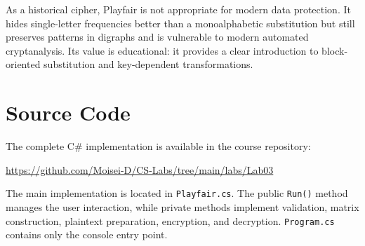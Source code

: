 \documentclass[12pt,a4paper]{article}
\begin{document}
As a historical cipher, Playfair is not appropriate for modern data protection. It hides single-letter frequencies better than a monoalphabetic substitution but still preserves patterns in digraphs and is vulnerable to modern automated cryptanalysis. Its value is educational: it provides a clear introduction to block-oriented substitution and key-dependent transformations.

\section{Source Code}

The complete C\# implementation is available in the course repository:

\begin{center}
  \url{https://github.com/Moisei-D/CS-Labs/tree/main/labs/Lab03}
\end{center}

The main implementation is located in \texttt{Playfair.cs}. The public \texttt{Run()} method manages the user interaction, while private methods implement validation, matrix construction, plaintext preparation, encryption, and decryption. \texttt{Program.cs} contains only the console entry point.
\end{document}
